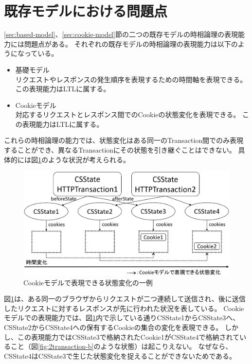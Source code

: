 \documentclass[12pt,a4paper]{jbook}
\begin{document}
\section{既存モデルにおける問題点}
\label{sec:existing-models-problems}
\ref{sec:based-model}、\ref{sec:cookie-model}節の二つの既存モデルの時相論理の表現能力には問題点がある。
それぞれの既存モデルの時相論理の表現能力は以下のようになっている。
\color{red}
\begin{itemize}
\item 基礎モデル \\
リクエストやレスポンスの発生順序を表現するための時間軸を表現できる。
この表現能力はLTLに属する。
\item Cookieモデル \\
対応するリクエストとレスポンス間でのCookieの状態変化を表現できる。
この表現能力はLTLに属する。
\end{itemize}
\color{black}
これらの時相論理の能力では、状態変化はある同一のTransaction間でのみ表現することができ、異なるTransactionにその状態を引き継ぐことはできない。
具体的には図\ref{fig:2transaction-a}のような状況が考えられる。
\begin{figure}[htb]
\centering
\includegraphics[width=450pt]{./fig/2transaction-a.eps}
\caption{Cookieモデルで表現できる状態変化の一例}
\label{fig:2transaction-a}
\end{figure}
図\ref{fig:2transaction-a}は、ある同一のブラウザからリクエストが二つ連続して送信され、後に送信したリクエストに対するレスポンスが先に行われた状況を表している。
Cookieモデルでの表現能力では、図\ref{fig:2transaction-a}内で示している通りCSState1からCSState3へ、CSState2からCSState4への保有するCookieの集合の変化を表現できる。
しかし、この表現能力ではCSState3で格納されたCookie1がCSState4で格納されていること（図\ref{fig:2transaction-b}のような状態）は起こりえない。
なぜなら、CSState4はCSState3で生じた状態変化を捉えることができないためである。
\end{document}
